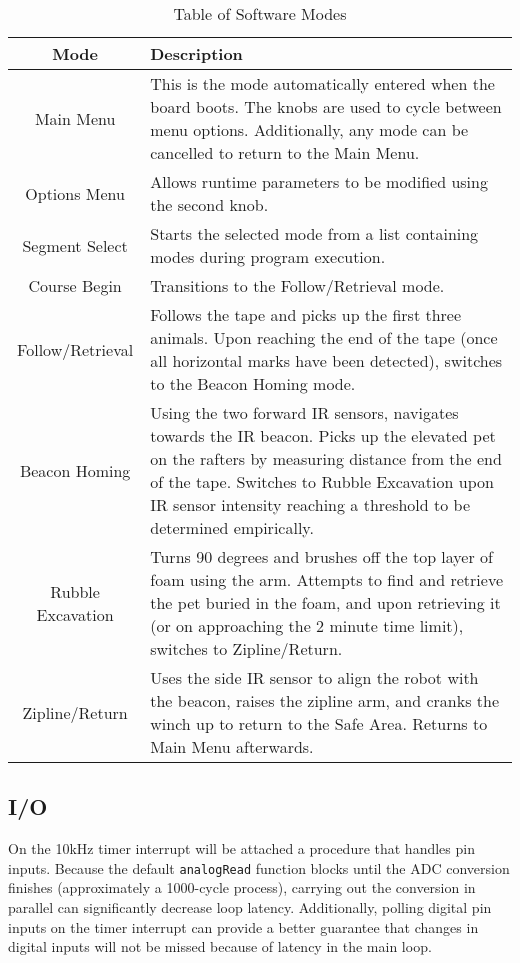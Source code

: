 \documentclass[11pt, oneside]{article} %
\begin{document}
\begin{table}
	\caption{Table of Software Modes}
	\centering
	\begin{tabular}{ | c | p{5in} | }
	\hline
	\textbf{Mode} & \textbf{Description} \\ \hline
	Main Menu & This is the mode automatically entered when the board boots. The knobs are used to cycle between menu options. Additionally, any mode can be cancelled to return to the Main Menu. \\ \hline
	Options Menu & Allows runtime parameters to be modified using the second knob. \\ \hline
	Segment Select & Starts the selected mode from a list containing modes during program execution. \\ \hline
	Course Begin & Transitions to the Follow/Retrieval mode. \\ \hline
	Follow/Retrieval & Follows the tape and picks up the first three animals. Upon reaching the end of the tape (once all horizontal marks have been detected), switches to the Beacon Homing mode. \\ \hline
	Beacon Homing & Using the two forward IR sensors, navigates towards the IR beacon. Picks up the elevated pet on the rafters by measuring distance from the end of the tape. Switches to Rubble Excavation upon IR sensor intensity reaching a threshold to be determined empirically. \\ \hline
	Rubble Excavation & Turns 90 degrees and brushes off the top layer of foam using the arm. Attempts to find and retrieve the pet buried in the foam, and upon retrieving it (or on approaching the 2 minute time limit), switches to Zipline/Return. \\ \hline
	Zipline/Return &
	Uses the side IR sensor to align the robot with the beacon, raises the zipline arm, and cranks the winch up to return to the Safe Area. Returns to Main Menu afterwards.
	\\ \hline
	\end{tabular}
	\label{table:Software Modes}
\end{table}

	\subsection{I/O}
	
	On the 10kHz timer interrupt will be attached a procedure that handles pin inputs. Because the default \texttt{analogRead} function blocks until the ADC conversion finishes (approximately a 1000-cycle process), carrying out the conversion in parallel can significantly decrease loop latency. Additionally, polling digital pin inputs on the timer interrupt can provide a better guarantee that changes in digital inputs will not be missed because of latency in the main loop.
\end{document}
